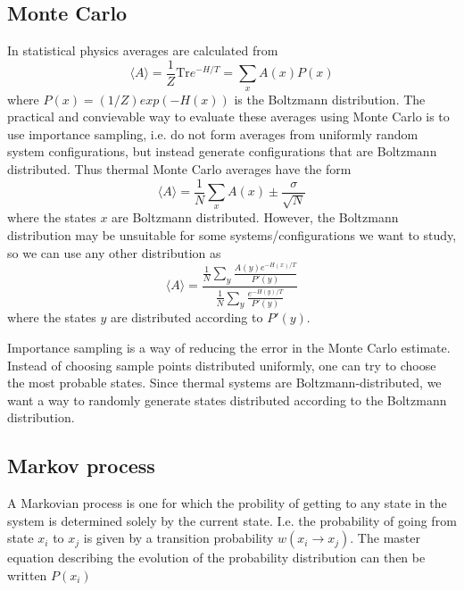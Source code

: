 \documentclass[a4paper]{article}
\newcommand{\trm}[1]{\textrm{#1}}
\begin{document}
\subsection{Monte Carlo}
In statistical physics averages are calculated from 
\begin{equation}
  \langle A\rangle = \frac{1}{Z}\trm{Tr} e^{-H/T} = \sum_x A(x) P(x)
\end{equation}
where  $P(x) = (1/Z)exp(-H(x))$ is the Boltzmann distribution.
The practical and convievable way to evaluate these averages using Monte Carlo is to use importance sampling, i.e. do not form averages from uniformly random system configurations, but instead generate configurations that are Boltzmann distributed.   
Thus thermal Monte Carlo averages have the form 
\begin{equation}
  \langle A \rangle = \frac{1}{N} \sum_x A(x) \pm \frac{\sigma	}{\sqrt N}
\end{equation}
where the states $x$ are Boltzmann distributed.
However, the Boltzmann distribution may be unsuitable for some systems/configurations we want to study, so we can use any other distribution as 
\begin{equation}
  \langle A \rangle = \frac{\frac{1}{N}\sum_y \frac{A(y) e^{-H(x)/T}}{P'(y)}}{\frac{1}{N}\sum_y \frac{e^{-H(y)/T}}{P'(y)}}  
\end{equation}
 where the states $y$ are distributed according to $P'(y)$.

 Importance sampling is a way of reducing the error in the Monte Carlo estimate. Instead of choosing sample points distributed uniformly, one can try to choose the most probable states. Since thermal systems are Boltzmann-distributed, we want a way to randomly generate states distributed according to the Boltzmann distribution.
\subsection{Markov process}
A Markovian process is one for which the probility of getting to any state in the system is determined solely by the current state. I.e. the probability of going from state $x_i$ to $x_{j}$ is given by a transition probability $w(x_i \rightarrow x_j)$. The master equation describing the evolution of the probability distribution can then be written $P(x_i )$
 
\end{document}
